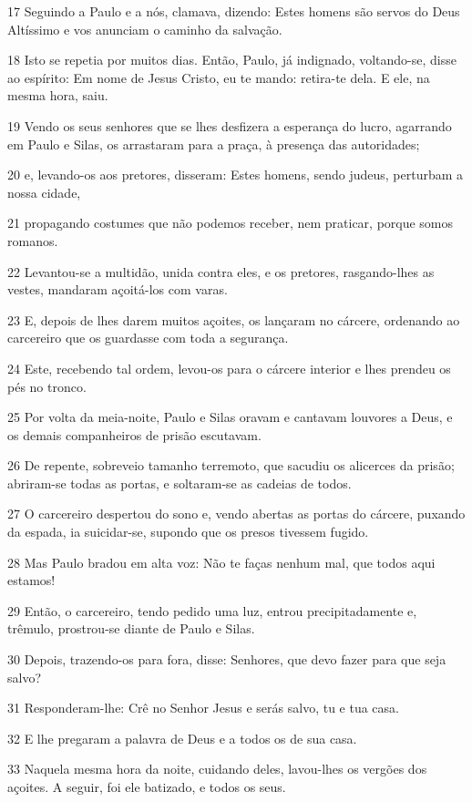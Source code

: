 \par 17 Seguindo a Paulo e a nós, clamava, dizendo: Estes homens são servos do Deus Altíssimo e vos anunciam o caminho da salvação.
\par 18 Isto se repetia por muitos dias. Então, Paulo, já indignado, voltando-se, disse ao espírito: Em nome de Jesus Cristo, eu te mando: retira-te dela. E ele, na mesma hora, saiu.
\par 19 Vendo os seus senhores que se lhes desfizera a esperança do lucro, agarrando em Paulo e Silas, os arrastaram para a praça, à presença das autoridades;
\par 20 e, levando-os aos pretores, disseram: Estes homens, sendo judeus, perturbam a nossa cidade,
\par 21 propagando costumes que não podemos receber, nem praticar, porque somos romanos.
\par 22 Levantou-se a multidão, unida contra eles, e os pretores, rasgando-lhes as vestes, mandaram açoitá-los com varas.
\par 23 E, depois de lhes darem muitos açoites, os lançaram no cárcere, ordenando ao carcereiro que os guardasse com toda a segurança.
\par 24 Este, recebendo tal ordem, levou-os para o cárcere interior e lhes prendeu os pés no tronco.
\par 25 Por volta da meia-noite, Paulo e Silas oravam e cantavam louvores a Deus, e os demais companheiros de prisão escutavam.
\par 26 De repente, sobreveio tamanho terremoto, que sacudiu os alicerces da prisão; abriram-se todas as portas, e soltaram-se as cadeias de todos.
\par 27 O carcereiro despertou do sono e, vendo abertas as portas do cárcere, puxando da espada, ia suicidar-se, supondo que os presos tivessem fugido.
\par 28 Mas Paulo bradou em alta voz: Não te faças nenhum mal, que todos aqui estamos!
\par 29 Então, o carcereiro, tendo pedido uma luz, entrou precipitadamente e, trêmulo, prostrou-se diante de Paulo e Silas.
\par 30 Depois, trazendo-os para fora, disse: Senhores, que devo fazer para que seja salvo?
\par 31 Responderam-lhe: Crê no Senhor Jesus e serás salvo, tu e tua casa.
\par 32 E lhe pregaram a palavra de Deus e a todos os de sua casa.
\par 33 Naquela mesma hora da noite, cuidando deles, lavou-lhes os vergões dos açoites. A seguir, foi ele batizado, e todos os seus.
